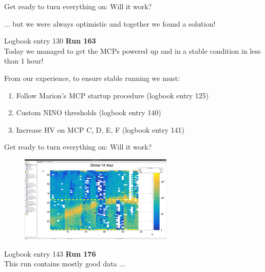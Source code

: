 \documentclass[xcolor = table]{beamer}
\begin{document}
\begin{frame}{Get ready to turn everything on: Will it work?}
  \begin{center}
    \large ... but we were always optimistic and together we found a solution!
  \end{center}
  \begin{block}{Logbook entry 130}
    \textbf{Run 163}\\
    Today we managed to get the MCPs powered up and in a stable condition in less than 1 hour!
  \end{block}
  \begin{center}
    From our experience, to ensure stable running we must:
  \end{center}
  \begin{enumerate}
    \item{Follow Marion's MCP startup procedure (logbook entry 125)}
    \item{Custom NINO thresholds (logbook entry 140)}
    \item{Increase HV on MCP C, D, E, F (logbook entry 141)}
  \end{enumerate}
\end{frame}

\begin{frame}{Get ready to turn everything on: Will it work?}
  \begin{figure}
    \centering
    \includegraphics[width = 0.65\textwidth]{Plots/Run176HitMap.png}
  \end{figure}
  \vspace{-0.2cm}
  \begin{block}{Logbook entry 143}
    \textbf{Run 176}\\
    This run contains mostly good data ...
  \end{block}
\end{frame}
\end{document}
